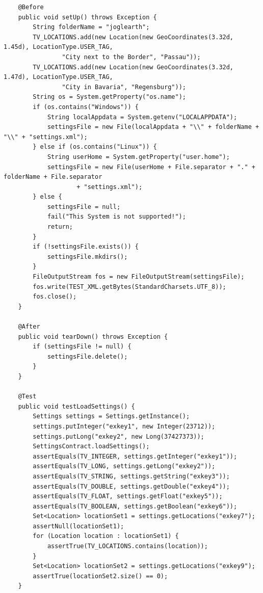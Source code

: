 \documentclass[10pt]{scrreprt}
\begin{document}
\begin{lstlisting}
    @Before
    public void setUp() throws Exception {
        String folderName = "joglearth";
        TV_LOCATIONS.add(new Location(new GeoCoordinates(3.32d, 1.45d), LocationType.USER_TAG,
                "City next to the Border", "Passau"));
        TV_LOCATIONS.add(new Location(new GeoCoordinates(3.32d, 1.47d), LocationType.USER_TAG,
                "City in Bavaria", "Regensburg"));
        String os = System.getProperty("os.name");
        if (os.contains("Windows")) {
            String localAppdata = System.getenv("LOCALAPPDATA");
            settingsFile = new File(localAppdata + "\\" + folderName + "\\" + "settings.xml");
        } else if (os.contains("Linux")) {
            String userHome = System.getProperty("user.home");
            settingsFile = new File(userHome + File.separator + "." + folderName + File.separator
                    + "settings.xml");
        } else {
            settingsFile = null;
            fail("This System is not supported!");
            return;
        }
        if (!settingsFile.exists()) {
            settingsFile.mkdirs();
        }
        FileOutputStream fos = new FileOutputStream(settingsFile);
        fos.write(TEST_XML.getBytes(StandardCharsets.UTF_8));
        fos.close();
    }

    @After
    public void tearDown() throws Exception {
        if (settingsFile != null) {
            settingsFile.delete();
        }
    }

    @Test
    public void testLoadSettings() {
        Settings settings = Settings.getInstance();
        settings.putInteger("exkey1", new Integer(23712));
        settings.putLong("exkey2", new Long(37427373));
        SettingsContract.loadSettings();
        assertEquals(TV_INTEGER, settings.getInteger("exkey1"));
        assertEquals(TV_LONG, settings.getLong("exkey2"));
        assertEquals(TV_STRING, settings.getString("exkey3"));
        assertEquals(TV_DOUBLE, settings.getDouble("exkey4"));
        assertEquals(TV_FLOAT, settings.getFloat("exkey5"));
        assertEquals(TV_BOOLEAN, settings.getBoolean("exkey6"));
        Set<Location> locationSet1 = settings.getLocations("exkey7");
        assertNull(locationSet1);
        for (Location location : locationSet1) {
            assertTrue(TV_LOCATIONS.contains(location));
        }
        Set<Location> locationSet2 = settings.getLocations("exkey9");
        assertTrue(locationSet2.size() == 0);
    }


\end{lstlisting}
\end{document}
